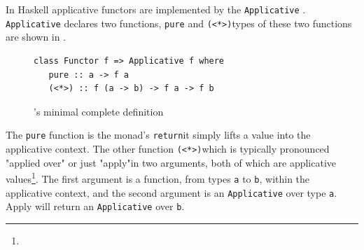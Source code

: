 In Haskell applicative functors are implemented by the \texttt{Applicative} \DIFdelbegin {}\DIFdelend \DIFaddbegin {}\DIFaddend . \texttt{Applicative} declares two functions, \texttt{pure} and \texttt{(<*>)}\DIFdelbegin {}\DIFdelend \DIFaddbegin {}\DIFaddend types of these two functions are shown in \DIFdelbegin {}\texttt{} %
\DIFdelend \DIFaddbegin {}\DIFaddend . 

\begin{figure}[t]
\DIFdelbeginFL %

\DIFdelendFL \DIFaddbeginFL \begin{lstlisting}
class Functor f => Applicative f where
   pure :: a -> f a
   (<*>) :: f (a -> b) -> f a -> f b
\end{lstlisting}
\DIFaddendFL \caption{\DIFdelbeginFL {}\DIFdelendFL \DIFaddbeginFL \texttt{}\DIFaddendFL 's minimal complete definition}
\label{appTypes}
\end{figure}

The \texttt{pure} function is the \DIFdelbegin {}\DIFdelend \DIFaddbegin {}\DIFaddend monad's \texttt{return}\DIFdelbegin \DIFdel{, }\DIFdelend \DIFaddbegin \DIFadd{: }\DIFaddend it simply lifts a value into the applicative context. The other function \texttt{(<*>)}\DIFdelbegin \DIFdel{(}\DIFdelend \DIFaddbegin \DIFadd{, }\DIFaddend which is typically pronounced "applied over" or just "apply"\DIFdelbegin {}\DIFdelend \DIFaddbegin {}\DIFaddend in two arguments, both of which are applicative values\DIFaddbegin \footnote{}\DIFaddend . The first argument is a function, from types \texttt{a} to \texttt{b}, within the applicative context, and the second argument is an \texttt{Applicative} over type \texttt{a}. Apply will return an \texttt{Applicative} over \texttt{b}.

